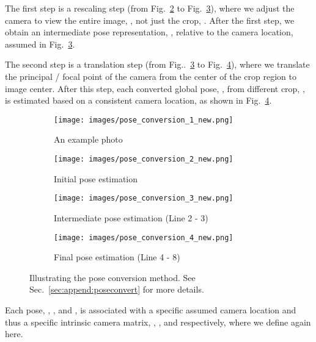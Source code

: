 \documentclass[final]{cvpr}
\begin{document}
The first step is a rescaling step (from Fig.~\ref{fig:initial_pose} to Fig.~\ref{fig:intermediate_pose}), where we adjust the camera to view the entire image, , not just the crop, .
After the first step, we obtain an intermediate pose representation, , relative to the camera location, assumed in Fig.~\ref{fig:intermediate_pose}. 

The second step is a translation step (from Fig..~\ref{fig:intermediate_pose} to Fig.~\ref{fig:final_pose}), where we translate the principal / focal point of the camera from the center of the crop region to image center. After this step, each converted global pose, , from different crop, , is estimated based on a consistent camera location, as shown in Fig.~\ref{fig:final_pose}. 


\begin{figure*}[!t]
    \centering
    \begin{subfigure}{.45\textwidth}
      \centering
      \texttt{[image: images/pose\_conversion\_1\_new.png]}  
      \caption{An example photo}
      \label{fig:pose_photo}
    \end{subfigure}
    \begin{subfigure}{.45\textwidth}
      \centering
      \texttt{[image: images/pose\_conversion\_2\_new.png]}  
      \caption{Initial pose estimation }
      \label{fig:initial_pose}
    \end{subfigure}
    \newline
    \begin{subfigure}{.45\textwidth}
      \centering
      \texttt{[image: images/pose\_conversion\_3\_new.png]}  
      \caption{Intermediate pose estimation  (Line 2 - 3)}
      \label{fig:intermediate_pose}
    \end{subfigure}
    \begin{subfigure}{.45\textwidth}
      \centering
      \texttt{[image: images/pose\_conversion\_4\_new.png]}  
      \caption{Final pose estimation  (Line 4 - 8)}
      \label{fig:final_pose}
    \end{subfigure}
    \caption{Illustrating the pose conversion method. See Sec.~\ref{sec:append:poseconvert} for more details.}
    \label{fig:fig}
\end{figure*}

Each pose, , , and , is associated with a specific assumed camera location and thus a specific intrinsic camera matrix, , , and  respectively, where we define again here. 
\end{document}
